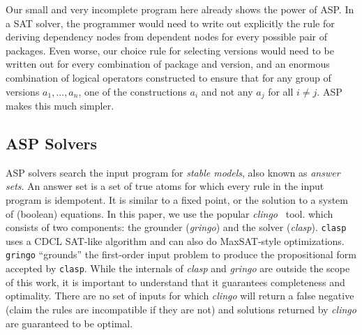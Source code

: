 Our small and very incomplete program here already shows the power of ASP. In a SAT
solver, the programmer would need to write out explicitly the rule for deriving
dependency nodes from dependent nodes for every possible pair of packages. Even worse,
our choice rule for selecting versions would need to be written out for every
combination of package and version, and an enormous combination of logical operators
constructed to ensure that for any group of versions \texttt{$a_1, ..., a_n$}, one of
the constructions \texttt{$a_i$} and not any \texttt{$a_j$} for all $i\neq{j}$. ASP
makes this much simpler.


\subsection{ASP Solvers}

ASP solvers search the input program for {\it stable models}, also known as
\textit{answer sets}. An answer set is a set of true atoms for which every rule in the
input program is idempotent. It is similar to a fixed point, or the solution to a system
of (boolean) equations.
%
%
%
In this paper, we use the popular \textit{clingo}~\cite{gebser+:aicomm11} tool. which
consists of two components: the grounder (\textit{gringo}) and the solver
(\textit{clasp}). \texttt{clasp} uses a CDCL SAT-like algorithm and can also do
MaxSAT-style optimizations. \texttt{gringo} ``grounds'' the first-order input problem to
produce the propositional form accepted by {\tt clasp}.
%
While the internals of \textit{clasp} and \textit{gringo} are outside the scope of this
work, it is important to understand that it guarantees completeness and optimality.
There are no set of inputs for which \textit{clingo} will return a false negative (claim
the rules are incompatible if they are not) and solutions returned by
\textit{clingo} are guaranteed to be optimal.

